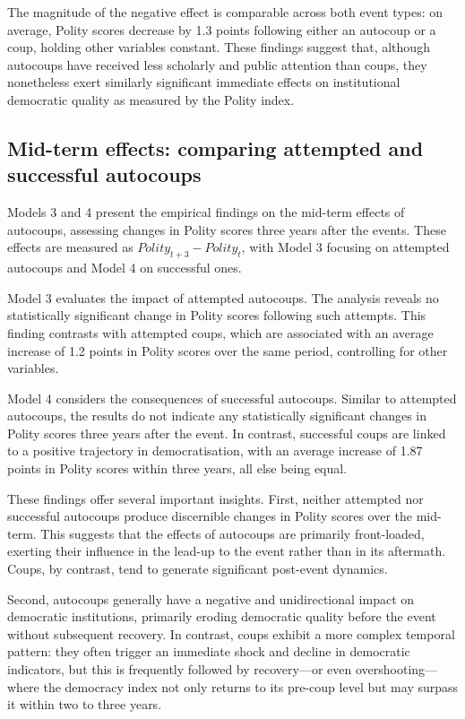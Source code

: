 \documentclass[
  12pt,
]{report}
\begin{document}
The magnitude of the negative effect is comparable across both event
types: on average, Polity scores decrease by 1.3 points following either
an autocoup or a coup, holding other variables constant. These findings
suggest that, although autocoups have received less scholarly and public
attention than coups, they nonetheless exert similarly significant
immediate effects on institutional democratic quality as measured by the
Polity index.

\subsection*{Mid-term effects: comparing attempted and successful
autocoups}\label{mid-term-effects-comparing-attempted-and-successful-autocoups}

Models 3 and 4 present the empirical findings on the mid-term effects of
autocoups, assessing changes in Polity scores three years after the
events. These effects are measured as
\(Polity_{t+3} - Polity_{t}\)\hspace{0pt}, with Model 3 focusing on
attempted autocoups and Model 4 on successful ones.

Model 3 evaluates the impact of attempted autocoups. The analysis
reveals no statistically significant change in Polity scores following
such attempts. This finding contrasts with attempted coups, which are
associated with an average increase of 1.2 points in Polity scores over
the same period, controlling for other variables.

Model 4 considers the consequences of successful autocoups. Similar to
attempted autocoups, the results do not indicate any statistically
significant changes in Polity scores three years after the event. In
contrast, successful coups are linked to a positive trajectory in
democratisation, with an average increase of 1.87 points in Polity
scores within three years, all else being equal.

These findings offer several important insights. First, neither
attempted nor successful autocoups produce discernible changes in Polity
scores over the mid-term. This suggests that the effects of autocoups
are primarily front-loaded, exerting their influence in the lead-up to
the event rather than in its aftermath. Coups, by contrast, tend to
generate significant post-event dynamics.

Second, autocoups generally have a negative and unidirectional impact on
democratic institutions, primarily eroding democratic quality before the
event without subsequent recovery. In contrast, coups exhibit a more
complex temporal pattern: they often trigger an immediate shock and
decline in democratic indicators, but this is frequently followed by
recovery---or even overshooting---where the democracy index not only
returns to its pre-coup level but may surpass it within two to three
years.
\end{document}
